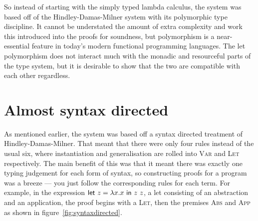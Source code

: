 So instead of starting with the simply typed lambda calculus, the
system was based off of the Hindley-Damas-Milner system with its
polymorphic type discipline. It cannot be understated the amount of
extra complexity and work this introduced into the proofs for
soundness, but polymorphism is a near-essential feature in today's
modern functional programming languages. The let polymorphism does not
interact much with the monadic and resourceful parts of the type
system, but it is desirable to show that the two are compatible with
each other regardless.

\section{Almost syntax directed}\label{sec:almost-synt-direct}
As mentioned earlier, the system was based off a syntax directed
treatment of Hindley-Damas-Milner. That meant that there were only
four rules instead of the usual six, where instantiation and
generalisation are rolled into \textsc{Var} and \textsc{Let}
respectively. The main benefit of this was that it meant there was
exactly one typing judgement for each form of syntax, so constructing
proofs for a program was a breeze --- you just follow the corresponding rules
for each term. For example, in the expression $\mathsf{let} \ z = \lambda x . x \ \mathsf{in} \ z \
  z$, a let consisting of an abstraction and an application, the proof begins with a
\textsc{Let}, then the premises \textsc{Abs} and \textsc{App} as shown
in figure~\ref{fig:syntaxdirected}.

